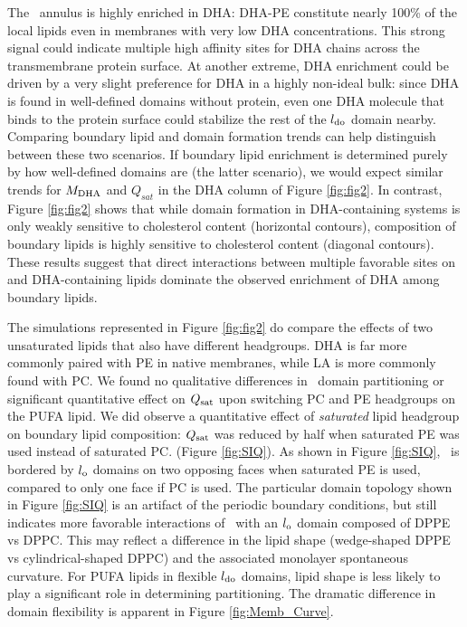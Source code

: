 	The \nachr~annulus is highly enriched in DHA: DHA-PE constitute nearly 100\% of the local lipids even in membranes with very low DHA concentrations. This strong signal could indicate multiple high affinity sites for DHA chains across the transmembrane protein surface. At another extreme, DHA enrichment could be driven by a very slight preference for DHA in a highly non-ideal bulk: since DHA is found in well-defined domains without protein, even one DHA molecule that binds to the protein surface could stabilize the rest of the $l_{\mathrm{do}}$ domain nearby. Comparing boundary lipid and domain formation trends can help distinguish between these two scenarios.  If boundary lipid enrichment is determined purely by how well-defined domains are (the latter scenario), we would expect similar trends for $M_{\mathrm{DHA}}$ and $Q_{sat}$ in the DHA column of Figure \ref{fig:fig2}.  In contrast,  Figure \ref{fig:fig2} shows that while domain formation in DHA-containing systems is only weakly sensitive to cholesterol content (horizontal contours), composition of boundary lipids is highly sensitive to cholesterol content (diagonal contours). These results suggest that direct interactions between multiple favorable sites on \nachr and DHA-containing lipids dominate the observed enrichment of DHA among boundary lipids.  
	
	The simulations represented in Figure \ref{fig:fig2} do compare the effects of two unsaturated lipids that also have different headgroups. DHA is far more commonly paired with PE in native membranes, while LA is more commonly found with PC. We found no qualitative differences in \nachr~domain partitioning or significant quantitative effect on $Q_{\mathrm{sat}}$ upon switching PC and PE headgroups on the PUFA lipid.  We did observe a quantitative effect of \emph{saturated} lipid headgroup on boundary lipid composition: $Q_{\mathrm{sat}}$ was reduced by half when saturated PE was used instead of saturated PC. (Figure \ref{fig:SIQ}).  As shown in Figure \ref{fig:SIQ}, \nachr~is bordered by $l_{\mathrm{o}}$ domains on two opposing faces when saturated PE is used, compared to only one face if PC is used.  
The particular domain topology shown in Figure \ref{fig:SIQ} is an artifact of the periodic boundary conditions, but still indicates more favorable interactions of \nachr~with an $l_{\mathrm{o}}$ domain composed of DPPE vs DPPC. This may reflect a difference in the lipid shape (wedge-shaped DPPE vs cylindrical-shaped DPPC) and the associated monolayer spontaneous curvature.  For PUFA lipids in flexible $l_{\mathrm{do}}$ domains, lipid shape is less likely to play a significant role in determining partitioning. The dramatic difference in domain flexibility is apparent in  Figure \ref{fig:Memb_Curve}.   
	
